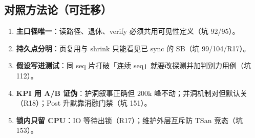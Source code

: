 \subsection{对照方法论（可迁移）}
\begin{enumerate}[leftmargin=1.6em]
  \item \textbf{主口径唯一}：读路径、退休、verify 必须共用可见性定义（坑 92/95）。
  \item \textbf{持久点分明}：页复用与 shrink 只能看见已 sync 的 SB（坑 99/104/R17）。
  \item \textbf{假设写进测试}：同 seq 片打破「连续 seq」就要改探测并加判别力用例（坑 112）。
  \item \textbf{KPI 用 A/B 证伪}：护洞叙事正确但 200k 峰不动；并洞机制对但默认关（R18）；Post 升默靠消融门禁（坑 151）。
  \item \textbf{锁内只留 CPU}：IO 等待出锁（R17）；维护外层互斥防 TSan 竞态（坑 153）。
\end{enumerate}
